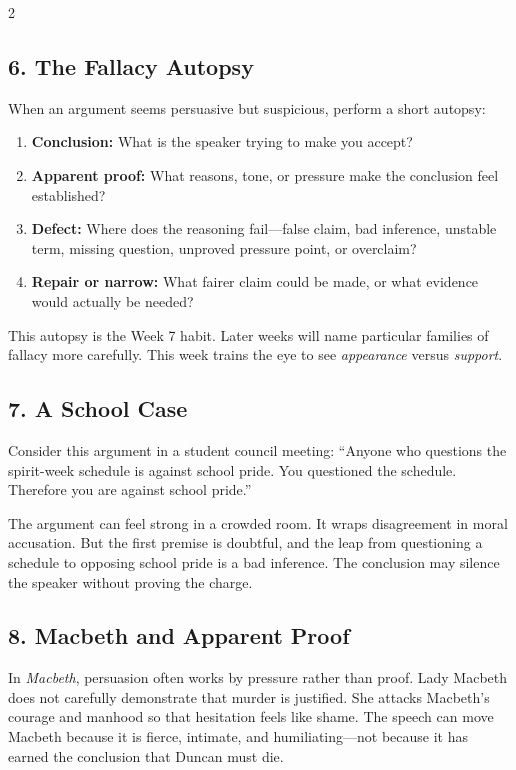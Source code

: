 \documentclass[12pt]{article}
\begin{document}
\begin{multicols}{2}
\subsection*{6. The Fallacy Autopsy}
When an argument seems persuasive but suspicious, perform a short autopsy:

\begin{enumerate}[leftmargin=*,itemsep=0.12em]
\item \textbf{Conclusion:} What is the speaker trying to make you accept?
\item \textbf{Apparent proof:} What reasons, tone, or pressure make the conclusion feel established?
\item \textbf{Defect:} Where does the reasoning fail---false claim, bad inference, unstable term, missing question, unproved pressure point, or overclaim?
\item \textbf{Repair or narrow:} What fairer claim could be made, or what evidence would actually be needed?
\end{enumerate}

This autopsy is the Week 7 habit. Later weeks will name particular families of fallacy more carefully. This week trains the eye to see \textit{appearance} versus \textit{support}.

\subsection*{7. A School Case}
Consider this argument in a student council meeting: ``Anyone who questions the spirit-week schedule is against school pride. You questioned the schedule. Therefore you are against school pride.''

The argument can feel strong in a crowded room. It wraps disagreement in moral accusation. But the first premise is doubtful, and the leap from questioning a schedule to opposing school pride is a bad inference. The conclusion may silence the speaker without proving the charge.

\subsection*{8. Macbeth and Apparent Proof}
In \textit{Macbeth}, persuasion often works by pressure rather than proof. Lady Macbeth does not carefully demonstrate that murder is justified. She attacks Macbeth's courage and manhood so that hesitation feels like shame. The speech can move Macbeth because it is fierce, intimate, and humiliating---not because it has earned the conclusion that Duncan must die.


\end{multicols}
\end{document}

